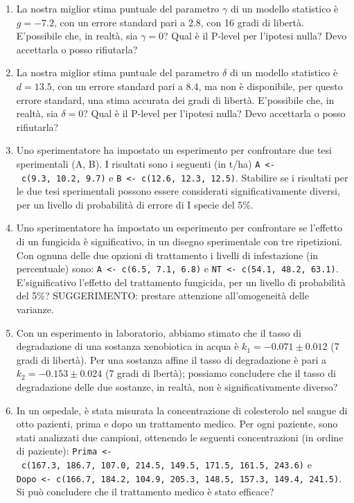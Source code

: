 \documentclass[
  12pt,
]{book}
\providecommand{\tightlist}{%
  \setlength{\itemsep}{0pt}\setlength{\parskip}{0pt}}
\begin{document}
\begin{enumerate}
\def\labelenumi{\arabic{enumi}.}
\tightlist
\item
  La nostra miglior stima puntuale del parametro \(\gamma\) di un modello statistico è \(g = -7.2\), con un errore standard pari a 2.8, con 16 gradi di libertà. E'possibile che, in realtà, sia \(\gamma = 0\)? Qual è il P-level per l'ipotesi nulla? Devo accettarla o posso rifiutarla?
\item
  La nostra miglior stima puntuale del parametro \(\delta\) di un modello statistico è \(d = 13.5\), con un errore standard pari a 8.4, ma non è disponibile, per questo errore standard, una stima accurata dei gradi di libertà. E'possibile che, in realtà, sia \(\delta = 0\)? Qual è il P-level per l'ipotesi nulla? Devo accettarla o posso rifiutarla?
\item
  Uno sperimentatore ha impostato un esperimento per confrontare due tesi sperimentali (A, B). I risultati sono i seguenti (in t/ha) \texttt{A\ \textless{}-\ c(9.3,\ 10.2,\ 9.7)} e \texttt{B\ \textless{}-\ c(12.6,\ 12.3,\ 12.5)}. Stabilire se i risultati per le due tesi sperimentali possono essere considerati significativamente diversi, per un livello di probabilità di errore di I specie del 5\%.
\item
  Uno sperimentatore ha impostato un esperimento per confrontare se l'effetto di un fungicida è significativo, in un disegno sperimentale con tre ripetizioni. Con ognuna delle due opzioni di trattamento i livelli di infestazione (in percentuale) sono: \texttt{A\ \textless{}-\ c(6.5,\ 7.1,\ 6.8)} e \texttt{NT\ \textless{}-\ c(54.1,\ 48.2,\ 63.1)}. E'significativo l'effetto del trattamento fungicida, per un livello di probabilità del 5\%? SUGGERIMENTO: prestare attenzione all'omogeneità delle varianze.
\item
  Con un esperimento in laboratorio, abbiamo stimato che il tasso di degradazione di una sostanza xenobiotica in acqua è \(k_1 = -0.071 \pm 0.012\) (7 gradi di libertà). Per una sostanza affine il tasso di degradazione è pari a \(k_2 = -0.153 \pm 0.024\) (7 gradi di lbertà); possiamo concludere che il tasso di degradazione delle due sostanze, in realtà, non è significativamente diverso?
\item
  In un ospedale, è stata misurata la concentrazione di colesterolo nel sangue di otto pazienti, prima e dopo un trattamento medico. Per ogni paziente, sono stati analizzati due campioni, ottenendo le seguenti concentrazioni (in ordine di paziente): \texttt{Prima\ \textless{}-\ c(167.3,\ 186.7,\ 107.0,\ 214.5,\ 149.5,\ 171.5,\ 161.5,\ 243.6)} e \texttt{Dopo\ \textless{}-\ c(166.7,\ 184.2,\ 104.9,\ 205.3,\ 148.5,\ 157.3,\ 149.4,\ 241.5)}. Si può concludere che il trattamento medico è stato efficace?

\end{enumerate}
\end{document}
